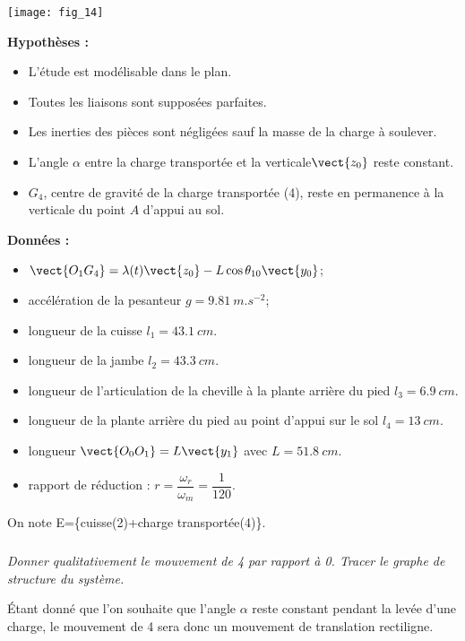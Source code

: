 \begin{multicols}{2}
\begin{center}
\texttt{[image: fig\_14]}
\end{center}


\noindent\textbf{Hypothèses :}
\begin{itemize}
\item L’étude est modélisable dans le plan.
\item Toutes les liaisons sont supposées parfaites.
\item Les inerties des pièces sont négligées sauf la masse de la charge à soulever.
\item L’angle $\alpha$ entre la charge transportée et la verticale$\vect{z_0}$ reste constant.
\item $G_4$, centre de gravité de la charge transportée (4), reste en permanence à la verticale du point $A$ d’appui au sol.
\end{itemize}

\noindent\textbf{Données :}
\begin{itemize}
\item $\vect{O_1G_4}=\lambda(t)\vect{z_0}-L\cos\theta_{10}\vect{y_0}$;
\item accélération de la pesanteur $g=\SI{9,81}{m.s^{-2}}$;
\item longueur de la cuisse $l_1 = \SI{43,1}{cm}$.
\item longueur de la jambe $l_2 = \SI{43,3}{cm}$.
\item longueur de l'articulation de la cheville à la plante arrière du pied $l_3 = \SI{6,9}{cm}$.
\item longueur de la plante arrière du pied au point d’appui sur le sol $l_4 = \SI{13}{cm}$.
\item longueur $\vect{O_0O_1}=L\vect{y_1}$ avec $L=\SI{51,8}{cm}$.
\item rapport de réduction : $r=\dfrac{\omega_r}{\omega_m}=\dfrac{1}{120}$.
\end{itemize}

On note E=\{cuisse(2)+charge transportée(4)\}. 

\fi

\subparagraph{} \textit{Donner qualitativement le mouvement de 4 par rapport à 0. Tracer le graphe de structure du système.}

\ifprof
\begin{corrige}
Étant donné que l'on souhaite que l'angle $\alpha$ reste constant pendant la levée d'une charge, le mouvement de 4 sera donc un mouvement de translation rectiligne.  


\end{corrige}
\end{multicols}
